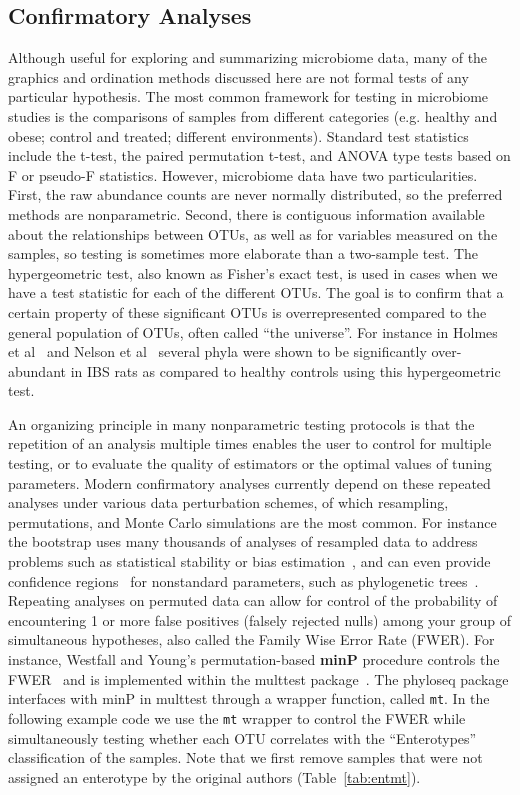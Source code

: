 \documentclass[10pt]{article}\usepackage{graphicx, color}
\newcommand{\code}[1]{{\texttt{#1}}}
\begin{document}
\subsection*{Confirmatory Analyses}
Although useful for exploring and summarizing microbiome data,
many of the graphics and ordination methods discussed here
are not formal tests of any particular hypothesis. 
The most common framework for testing in microbiome studies 
is the comparisons of samples from different categories
(e.g. healthy and obese; control and treated; different environments). 
Standard test statistics include the
t-test, 
the paired permutation t-test, 
and ANOVA type tests based on F or pseudo-F statistics.
However, microbiome data have two particularities.
First, the raw abundance counts are never normally distributed,
so the preferred methods are nonparametric.
Second, there is contiguous information available 
about the relationships between OTUs,
as well as for variables measured on the samples,
so testing is sometimes more elaborate
than a two-sample test.
The hypergeometric test,
also known as Fisher's exact test,
is used in cases when we have a test statistic for each
of the different OTUs.
The goal is to confirm that a certain property of these significant
OTUs is overrepresented compared to the general population of OTUs,
often called ``the universe''.
For instance
in Holmes et al~\cite{Holmes:2011vb}
and Nelson et al~\cite{Nelson:2010}
several phyla were shown to be significantly over-abundant 
in IBS rats as compared to healthy controls using this hypergeometric test. 

An organizing principle in many nonparametric 
testing protocols is that the repetition
of an analysis multiple times
enables the user to control for multiple testing, 
or to evaluate the quality of estimators 
or the optimal values of tuning parameters.
Modern confirmatory analyses currently depend 
on these repeated analyses under various
data perturbation schemes,
of which
resampling, 
permutations,
and Monte Carlo simulations are the most common. 
For instance the bootstrap uses
many thousands of analyses of resampled data
to address problems such as
statistical stability or
bias estimation~\cite{efron1993introduction},
and can even provide confidence regions~\cite{efron1993introduction}
for nonstandard parameters, such as phylogenetic trees~\cite{holmes2003bootstrapping}.
Repeating analyses on permuted data
can allow for control of the probability
of encountering 1 or more false positives (falsely rejected nulls)
among your group of simultaneous hypotheses, 
also called the Family Wise Error Rate (FWER).
For instance, Westfall and Young's permutation-based \textbf{minP} procedure
controls the FWER~\cite{Westfall:1993uu}
and is implemented within the multtest package~\cite{multtest}.
The phyloseq package interfaces with minP in multtest
through a wrapper function, called \code{mt}.
In the following example code we use the \code{mt} wrapper
to control the FWER while simultaneously testing
whether each OTU correlates with
the ``Enterotypes'' classification of the samples.
Note that we first remove samples
that were not assigned an enterotype by the original authors
(Table~\ref{tab:entmt}).
\end{document}
